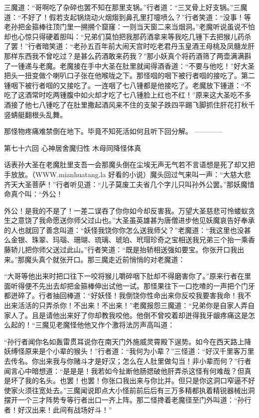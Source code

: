 \documentclass[12pt,UTF8]{ctexbook}
\begin{document}
三魔道：“哥啊吃了杂碎也罢不知在那里支锅。”行者道：“三叉骨上好支锅。”三魔道：“不好了！假若支起锅烧动火烟煼到鼻孔里打嚏喷么？”行者笑道：“没事！等老孙把金箍棒往顶门里一搠搠个窟窿：一则当天窗二来当烟洞。”老魔听说虽说不怕却也心惊只得硬着胆叫：“兄弟们莫怕把我那药酒拿来等我吃几锺下去把猴儿药杀了罢！”行者暗笑道：“老孙五百年前大闹天宫时吃老君丹玉皇酒王母桃及凤髓龙肝那样东西我不曾吃过？是甚么药酒敢来药我？”那小妖真个将药酒筛了两壶满满斟了一锺递与老魔。老魔接在手中大圣在肚里就闻得酒香道：“不要与他吃！”好大圣把头一扭变做个喇叭口子张在他喉咙之下。那怪啯的咽下被行者啯的接吃了。第二锺咽下被行者啯的又接吃了。一连咽了七八锺都是他接吃了。老魔放下锺道：“不吃了这酒常时吃两锺腹中如火却才吃了七八锺脸上红也不红！”原来这大圣吃不多酒接了他七八锺吃了在肚里撒起酒风来不住的支架子跌四平踢飞脚抓住肝花打秋千竖蜻艇翻根头乱舞。

那怪物疼痛难禁倒在地下。毕竟不知死活如何且听下回分解。
------------

第七十六回 心神居舍魔归性 木母同降怪体真

话表孙大圣在老魔肚里支吾一会那魔头倒在尘埃无声无气若不言语想是死了却又把手放放。（WWW.mianhuatang.la 好看的小说）魔头回过气来叫一声：“大慈大悲齐天大圣菩萨！”行者听见道：“儿子莫废工夫省几个字儿只叫孙外公罢。”那妖魔惜命真个叫：“外公！

外公！是我的不是了！一差二误吞了你你如今却反害我。万望大圣慈悲可怜蝼蚁贪生之意饶了我命愿送你师父过山也。”大圣虽英雄甚为唐僧进步他见妖魔哀告好奉承的人也就回了善念叫道：“妖怪我饶你你怎么送我师父？”老魔道：“我这里也没甚么金银、珠翠、玛瑙、珊瑚、琉璃、琥珀、玳瑁珍奇之宝相送我兄弟三个抬一乘香藤轿儿把你师父送过此山。”行者笑道：“既是抬轿相送强如要宝。你张开口我出来。”那魔头真个就张开口。那三魔走近前悄悄的对老魔道：

“大哥等他出来时把口往下一咬将猴儿嚼碎咽下肚却不得磨害你了。”原来行者在里面听得便不先出去却把金箍棒伸出试他一试。那怪果往下一口扢喳的一声把个门牙都迸碎了。行者抽回棒道：“好妖怪！我倒饶你性命出来你反咬我要害我命！我不出来活活的只弄杀你！不出来！不出来！”老魔报怨三魔道：“兄弟你是自家人弄自家人了。且是请他出来好了你却教我咬他。他倒不曾咬着却迸得我牙龈疼痛这是怎么起的！“三魔见老魔怪他他又作个激将法厉声高叫道：

“孙行者闻你名如轰雷贯耳说你在南天门外施威灵霄殿下逞势。如今在西天路上降妖缚怪原来是个小辈的猴头！”行者道：“我何为小辈？”三怪道：“好汉千里客万里去传名。你出来我与你赌斗才是好汉；怎么在人肚里做勾当！非小辈而何？”行者闻言心中暗想道：“是是是！我若如今扯断他肠揌破他肝弄杀这怪有何难哉？但真是坏了我的名头。也罢！也罢！你张口我出来与你比并。但只是你这洞口窄逼不好使家火须往宽处去。”三魔闻说即点大小怪前前后后有三万多精都执着精锐器械出洞摆开一个三才阵势专等行者出口一齐上阵。那二怪搀着老魔径至门外叫道：“孙行者！好汉出来！此间有战场好斗！”
\end{document}

